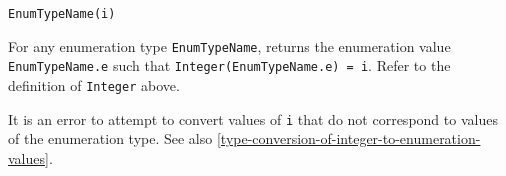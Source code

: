\begin{operatordefinition*}[<EnumTypeName>]
\begin{synopsis}\begin{lstlisting}
EnumTypeName(i)
\end{lstlisting}\end{synopsis}
\begin{semantics}
For any enumeration type \lstinline!EnumTypeName!, returns the enumeration value \lstinline!EnumTypeName.e! such that \lstinline!Integer(EnumTypeName.e) = i!.  Refer to the definition of
\lstinline!Integer! above.

It is an error to attempt to convert values of \lstinline!i! that do not correspond to values of the enumeration type.  See also \cref{type-conversion-of-integer-to-enumeration-values}.
\end{semantics}
\end{operatordefinition*}


